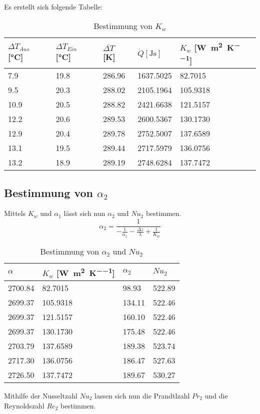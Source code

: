 \documentclass[12pt]{article}
\begin{document}
 Es erstellt sich folgende Tabelle:
 \begin{table}[ht!]
  \centering
 \begin{tabularx}{\textwidth}{XXXXX}
 $\Delta T _{Aus}$ [\si{\celsius}] &  $ \Delta T _{Ein}$ [\si{\celsius}] & $\overline{\Delta T}$ [\si{\kelvin}]
 & $\dot Q [\si{\joule\second}] $ & $ K _w$ [\si{\watt\per\square\meter\per\kelvin}] \\
\hline
\rowcolor{LightCyan}
 7.9  & 19.8 & 286.96 & 1637.5025 & 82.7015  \\
 9.5  & 20.3 & 288.02 & 2105.1964 & 105.9318 \\
 \rowcolor{LightCyan}
 10.9 & 20.5 & 288.82 & 2421.6638 & 121.5157 \\
 12.2 & 20.6 & 289.53 & 2600.5367 & 130.1730 \\
 \rowcolor{LightCyan}
 12.9 & 20.4 & 289.78 & 2752.5007 & 137.6589 \\
 13.1 & 19.5 & 289.44 & 2717.5979 & 136.0756 \\
 \rowcolor{LightCyan}
 13.2 & 18.9 & 289.19 & 2748.6284 & 137.7472 \\
\end{tabularx}
  \caption{Bestimmung von $K _w$}
\end{table}

\subsection{Bestimmung von $\alpha _2$}
Mittels $K _w$ und $\alpha _1$ lässt sich nun $\alpha _2$ und $Nu_2$ bestimmen.
\begin{equation}
  \alpha _2 = \frac{1}{-\frac{1}{\alpha _1} - \frac{\Delta z}{\lambda} + \frac{1}{K _w}}
\end{equation}

 \begin{table}[ht!]
  \centering
 \begin{tabularx}{\textwidth}{XXXX}
 $\alpha$ &  $K _w$ [\si{\watt\per\square\meter\per\kelvin}] & $ \alpha _2$ & $Nu _2 $  \\
\hline
\rowcolor{LightCyan}
2700.84 & 82.7015  & 98.93  & 522.89 \\
2699.37 & 105.9318 & 134.11 & 522.46 \\
2699.37 & 121.5157 & 160.10 & 522.46 \\
2699.37 & 130.1730 & 175.48 & 522.46 \\
2703.79 & 137.6589 & 189.38 & 523.74 \\
2717.30 & 136.0756 & 186.47 & 527.63 \\
2726.50 & 137.7472 & 189.67 & 530.27 \\
\end{tabularx}
  \caption{Bestimmung von $\alpha _2$ und $Nu _2$}
\end{table}
Mithilfe der Nusseltzahl $Nu_2$ lassen sich nun die Prandtlzahl $Pr _2$
und die Reynoldszahl $Re _2$ bestimmen.
\end{document}
